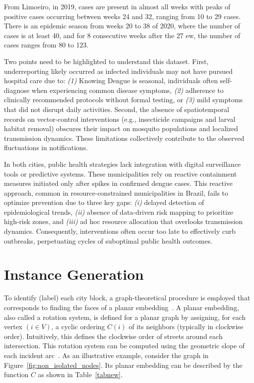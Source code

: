 From Limoeiro, in 2019, cases are present in almost all weeks with peaks of positive cases occurring between weeks 24 and 32, ranging from 10 to 29 cases. There is an epidemic season from weeks 20 to 38 of 2020, where the number of cases is at least 40, and for 8 consecutive weeks after the 27 \gls{ew}, the number of cases ranges from 80 to 123.

Two points need to be highlighted to understand this dataset. 
First, underreporting likely occurred as infected individuals may not have pursued hospital care due to: \textit{(1)} Knowing Dengue is seasonal, individuals often self-diagnose when experiencing common disease symptoms, \textit{(2)} adherence to clinically recommended protocols without formal testing, or \textit{(3)} mild symptoms that did not disrupt daily activities. Second, the absence of spatiotemporal records on vector-control interventions (e.g., insecticide campaigns and larval habitat removal) obscures their impact on mosquito populations and localized transmission dynamics. These limitations collectively contribute to the observed fluctuations in notifications.

In both cities, public health strategies lack integration with digital surveillance tools or predictive systems. These municipalities rely on reactive containment measures initiated only after spikes in confirmed dengue cases. This reactive approach, common in resource-constrained municipalities in Brazil, fails to optimize prevention due to three key gaps: \textit{(i)} delayed detection of epidemiological trends, \textit{(ii)} absence of data-driven risk mapping to prioritize high-risk zones, and \textit{(iii)} ad hoc resource allocation that overlooks transmission dynamics. Consequently, interventions often occur too late to effectively curb outbreaks, perpetuating cycles of suboptimal public health outcomes.

\section{Instance Generation}\label{sec:instance-generation}

To identify (label) each city block, a graph-theoretical procedure is employed
that corresponds to finding the faces of a planar
embedding~\citep{diestel2024graph}. A planar embedding, also called a rotation
system, is defined for a planar graph by assigning, for each vertex $( i \in V
	)$, a cyclic ordering $C(i)$ of its neighbors (typically in clockwise order).
Intuitively, this defines the clockwise order of streets around each
intersection. This rotation system can be computed using the geometric slope of
each incident arc~\citep{PhilipKleinShayMozes}. As an illustrative example,
consider the graph in Figure~\ref{fig:non_isolated_nodes}. Its planar embedding can be
described by the function $C$ as shown in Table~\ref{tabnew}.

